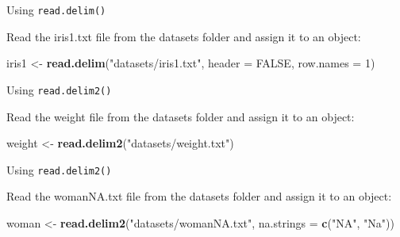 \documentclass[ignorenonframetext,]{beamer}
\newenvironment{Shaded}{\begin{snugshade}}{\end{snugshade}}
\newcommand{\DataTypeTok}[1]{\textcolor[rgb]{0.13,0.29,0.53}{#1}}
\newcommand{\DecValTok}[1]{\textcolor[rgb]{0.00,0.00,0.81}{#1}}
\newcommand{\KeywordTok}[1]{\textcolor[rgb]{0.13,0.29,0.53}{\textbf{#1}}}
\newcommand{\NormalTok}[1]{#1}
\newcommand{\OtherTok}[1]{\textcolor[rgb]{0.56,0.35,0.01}{#1}}
\newcommand{\StringTok}[1]{\textcolor[rgb]{0.31,0.60,0.02}{#1}}
\begin{document}
\begin{frame}[fragile]{Using \texttt{read.delim()}}
\protect\hypertarget{using-read.delim-1}{}

Read the iris1.txt file from the datasets folder and assign it to an
object:

\begin{Shaded}
\begin{Highlighting}[]
\NormalTok{iris1 <-}\StringTok{ }\KeywordTok{read.delim}\NormalTok{(}\StringTok{"datasets/iris1.txt"}\NormalTok{,}
                    \DataTypeTok{header =} \OtherTok{FALSE}\NormalTok{,}
                    \DataTypeTok{row.names =} \DecValTok{1}\NormalTok{)}
\end{Highlighting}
\end{Shaded}

\end{frame}

\begin{frame}[fragile]{Using \texttt{read.delim2()}}
\protect\hypertarget{using-read.delim2}{}

Read the weight file from the datasets folder and assign it to an
object:

\begin{Shaded}
\begin{Highlighting}[]
\NormalTok{weight <-}\StringTok{ }\KeywordTok{read.delim2}\NormalTok{(}\StringTok{"datasets/weight.txt"}\NormalTok{)}
\end{Highlighting}
\end{Shaded}

\end{frame}

\begin{frame}[fragile]{Using \texttt{read.delim2()}}
\protect\hypertarget{using-read.delim2-1}{}

Read the womanNA.txt file from the datasets folder and assign it to an
object:

\begin{Shaded}
\begin{Highlighting}[]
\NormalTok{woman <-}\StringTok{ }\KeywordTok{read.delim2}\NormalTok{(}\StringTok{"datasets/womanNA.txt"}\NormalTok{,}
                      \DataTypeTok{na.strings =} \KeywordTok{c}\NormalTok{(}\StringTok{"NA"}\NormalTok{, }\StringTok{"Na"}\NormalTok{))}
\end{Highlighting}
\end{Shaded}

\end{frame}
\end{document}
